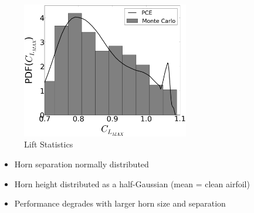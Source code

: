 \documentclass[9pt]{beamer}
\begin{document}
\begin{frame}
\begin{minipage}[t]{0.45\linewidth}
\begin{figure}[t]
\end{figure}
\vspace{-0.6cm}
\begin{figure}[t]
\includegraphics[width=0.65\textwidth]{MCgpcPDFMEGPCHorn_CL}
\caption{Lift Statistics}
\end{figure}
\end{minipage}
\begin{itemize}
\item Horn separation normally distributed
\item Horn height distributed as a half-Gaussian (mean = clean airfoil)
\item Performance degrades with larger horn size and separation
\end{itemize}
\end{frame}
\end{document}
